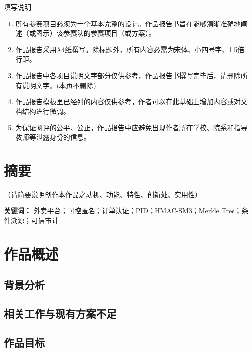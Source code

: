 \documentclass[UTF8,a4paper,zihao=-4,fontset=fandol]{ctexart}
\begin{document}
\begin{center}
  {\heiti{}填写说明}
\end{center}

\vspace{0.6em}

\begin{enumerate}[label=\arabic*., leftmargin=2em, itemsep=0pt, topsep=0pt]
  \item 所有参赛项目必须为一个基本完整的设计。作品报告书旨在能够清晰准确地阐述（或图示）该参赛队的参赛项目（或方案）。
  \item 作品报告采用A4纸撰写。除标题外，所有内容必需为宋体、小四号字、1.5倍行距。
  \item 作品报告中各项目说明文字部分仅供参考，作品报告书撰写完毕后，请删除所有说明文字。(本页不删除)
  \item 作品报告模板里已经列的内容仅供参考，作者可以在此基础上增加内容或对文档结构进行微调。
  \item 为保证网评的公平、公正，作品报告中应避免出现作者所在学校、院系和指导教师等泄露身份的信息。
\end{enumerate}



\newpage
\tableofcontents


\newpage
\section*{摘要}
（请简要说明创作本作品之动机、功能、特性、创新处、实用性）

\vspace{0.5em}
\noindent\textbf{关键词：} 外卖平台；可控匿名；订单认证；PID；HMAC-SM3；Merkle Tree；条件溯源；可信审计

\newpage
\section{作品概述}
\subsection{背景分析}

\subsection{相关工作与现有方案不足}

\subsection{作品目标}
\end{document}
